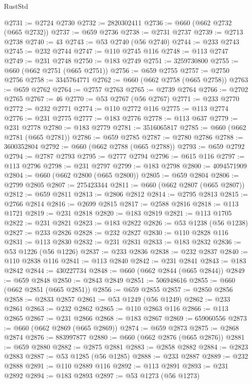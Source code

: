 \begin{lexlean}{RustStd}
\begin{coremodule}
{\begin{coremodule}
{{{{{{{{{{{{{{{{{{{{{{{{{{{{{{{{{{{{{{{{{{{{{{{@2731 := @2724 @2730
@2732 := 2820302411
@2736 := @660 (@662 @2732 (@665 @2732))
@2737 := @659 @2736
@2738 := @2731 @2737
@2739 := @2713 @2738
@2740 := 43
@2743 := @53 @2740 (@56 @2740)
@2744 := @233 @2743
@2745 := @232 @2744
@2747 := @110 @2745 @116
@2748 := @113 @2747
@2749 := @231 @2748
@2750 := @183 @2749
@2751 := 3259730800
@2755 := @660 (@662 @2751 (@665 @2751))
@2756 := @659 @2755
@2757 := @2750 @2756
@2758 := 3345764771
@2762 := @660 (@662 @2758 (@665 @2758))
@2763 := @659 @2762
@2764 := @2757 @2763
@2765 := @2739 @2764
@2766 := @2702 @2765
@2767 := 46
@2770 := @53 @2767 (@56 @2767)
@2771 := @233 @2770
@2772 := @232 @2771
@2774 := @110 @2772 @116
@2775 := @113 @2774
@2776 := @231 @2775
@2777 := @183 @2776
@2778 := @113 @637
@2779 := @231 @2778
@2780 := @183 @2779
@2781 := 3516065817
@2785 := @660 (@662 @2781 (@665 @2781))
@2786 := @659 @2785
@2787 := @2780 @2786
@2788 := 3600352804
@2792 := @660 (@662 @2788 (@665 @2788))
@2793 := @659 @2792
@2794 := @2787 @2793
@2795 := @2777 @2794
@2796 := @615 @116
@2797 := @113 @2796
@2798 := @231 @2797
@2799 := @183 @2798
@2800 := 4094571909
@2804 := @660 (@662 @2800 (@665 @2800))
@2805 := @659 @2804
@2806 := @2799 @2805
@2807 := 275423344
@2811 := @660 (@662 @2807 (@665 @2807))
@2812 := @659 @2811
@2813 := @2806 @2812
@2814 := @2795 @2813
@2815 := @2766 @2814
@2816 := @2699 @2815
@2817 := @2588 @2816
@2818 := @113 @1721
@2819 := @231 @2818
@2820 := @183 @2819
@2821 := @113 @1705
@2822 := @231 @2821
@2823 := @183 @2822
@2826 := @53 @1238 (@56 @1238)
@2827 := @233 @2826
@2828 := @232 @2827
@2830 := @110 @2828 @116
@2831 := @113 @2830
@2832 := @231 @2831
@2833 := @183 @2832
@2836 := @53 @1226 (@56 @1226)
@2837 := @233 @2836
@2838 := @232 @2837
@2840 := @110 @2838 @116
@2841 := @113 @2840
@2842 := @231 @2841
@2843 := @183 @2842
@2844 := 430227734
@2848 := @660 (@662 @2844 (@665 @2844))
@2849 := @659 @2848
@2850 := @2843 @2849
@2851 := 506948616
@2855 := @660 (@662 @2851 (@665 @2851))
@2856 := @659 @2855
@2857 := @2850 @2856
@2858 := @2833 @2857
@2861 := @53 @1249 (@56 @1249)
@2862 := @233 @2861
@2863 := @232 @2862
@2865 := @110 @2863 @116
@2866 := @113 @2865
@2867 := @231 @2866
@2868 := @183 @2867
@2869 := 659060556
@2873 := @660 (@662 @2869 (@665 @2869))
@2874 := @659 @2873
@2875 := @2868 @2874
@2876 := 883997877
@2880 := @660 (@662 @2876 (@665 @2876))
@2881 := @659 @2880
@2882 := @2875 @2881
@2883 := @2858 @2882
@2884 := @2823 @2883
@2887 := @53 @1285 (@56 @1285)
@2888 := @233 @2887
@2889 := @232 @2888
@2891 := @110 @2889 @116
@2892 := @113 @2891
@2893 := @231 @2892
@2894 := @183 @2893
@2897 := @53 @1273 (@56 @1273)
}}}}}}}}}}}}}}}}}}}}}}}}}}}}}}}}}}}}}}}}}}}}}}}
\end{coremodule}}
\end{coremodule}
\end{lexlean}
